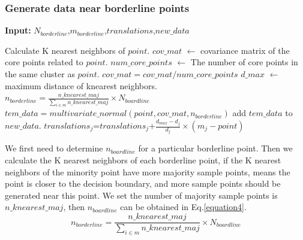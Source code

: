 \documentclass[runningheads]{llncs}
\begin{document}
\subsubsection{Generate data near borderline points}
\vspace{-0.5cm}
\begin{algorithm}[tb]
  \caption{$generate\_borderline$}
  \label{alg3}
  \hspace*{0.02in} {\bf Input:} %
   $N_{borderline}$,$m_{borderline}$,$translations$,$new\_data$
  \begin{algorithmic}
      \State Calculate K nearest neighbors of $point$.
      \State $cov\_mat$ $\leftarrow$ covariance matrix of the core points related to $point$.
      \State $num\_core\_points$ $\leftarrow$ The number of core points in the same cluster as $point$.
      \State $cov\_mat=cov\_mat/num\_core\_points$
      \State $d\_max$ $\leftarrow$ maximum distance of knearest neighbors.
  　　 \State $n_{borderline}=\frac{n\_knearest\_maj}{\sum_{i\in m} n\_knearest\_maj}\times N_{boardline}$
      \State $tem\_data=multivariate\_normal(point,cov\_mat,n_{borderline})$
      \State add $tem\_data$ to $new\_data$.
        \State $translations_j$=$translations_j$+$\frac{d_{max}-d_{j}}{d_{j}}\times (m_{j}-point)$
      \EndFor
  \EndFor
  \end{algorithmic}
\end{algorithm}
We first need to determine $n_{boardline}$ for a particular borderline point.
Then we calculate the K nearest neighbors of each borderline point, 
if the K nearest neighbors of the minority point have more majority sample points, 
means the point 
is closer to the decision boundary, and more sample points should be generated near this point.
We set the number of majority sample points is $n\_knearest\_maj$,
then $n_{boardline}$ can be obtained in Eq.\ref{equation4}.
\begin{equation}
  \label{equation4}
  n_{borderline}=\frac{n\_knearest\_maj}{\sum_{i\in m} n\_knearest\_maj}\times N_{boardline}
\end{equation}
\end{document}
